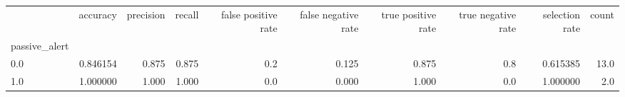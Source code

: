 \begin{tabular}{lrrrrrrrrr}
\toprule
{} &  accuracy &  precision &  recall &  false positive rate &  false negative rate &  true positive rate &  true negative rate &  selection rate &  count \\
passive\_alert &           &            &         &                      &                      &                     &                     &                 &        \\
\midrule
0.0           &  0.846154 &      0.875 &   0.875 &                  0.2 &                0.125 &               0.875 &                 0.8 &        0.615385 &   13.0 \\
1.0           &  1.000000 &      1.000 &   1.000 &                  0.0 &                0.000 &               1.000 &                 0.0 &        1.000000 &    2.0 \\
\bottomrule
\end{tabular}
